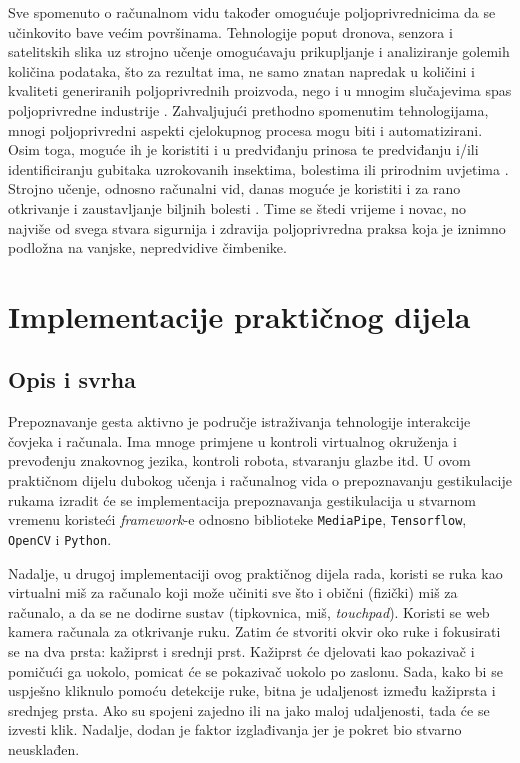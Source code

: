 \documentclass[]{foi} %
\begin{document}
Sve spomenuto o računalnom vidu također omogućuje poljoprivrednicima da se učinkovito bave većim površinama. Tehnologije poput dronova, senzora i satelitskih slika uz strojno učenje omogućavaju prikupljanje i analiziranje golemih količina podataka, što za rezultat ima, ne samo znatan napredak u količini i kvaliteti generiranih poljoprivrednih proizvoda, nego i u mnogim slučajevima spas poljoprivredne industrije \cite{vidhya}. Zahvaljujući prethodno spomenutim tehnologijama, mnogi poljoprivredni aspekti cjelokupnog procesa mogu biti i automatizirani. Osim toga, moguće ih je koristiti i u predviđanju prinosa te predviđanju i/ili identificiranju gubitaka uzrokovanih insektima, bolestima ili prirodnim uvjetima \cite{poljoprivreda}. Strojno učenje, odnosno računalni vid, danas moguće je koristiti i za rano otkrivanje i zaustavljanje biljnih bolesti \cite{vidhya}. Time se štedi vrijeme i novac, no najviše od svega stvara sigurnija i zdravija poljoprivredna praksa koja je iznimno podložna na vanjske, nepredvidive čimbenike.

\chapter{Implementacije praktičnog dijela}
\section{Opis i svrha}

Prepoznavanje gesta aktivno je područje istraživanja tehnologije interakcije čovjeka i računala. Ima mnoge primjene u kontroli virtualnog okruženja i prevođenju znakovnog jezika, kontroli robota, stvaranju glazbe itd. U ovom praktičnom dijelu dubokog učenja i računalnog vida o prepoznavanju gestikulacije rukama izradit će se implementacija prepoznavanja gestikulacija u stvarnom vremenu koristeći \textit{framework}-e odnosno biblioteke \texttt{MediaPipe}, \texttt{Tensorflow}, \texttt{OpenCV} i \texttt{Python}.

Nadalje, u drugoj implementaciji ovog praktičnog dijela rada, koristi se ruka kao virtualni miš za računalo koji može učiniti sve što i obični (fizički) miš za računalo, a da se ne dodirne sustav (tipkovnica, miš, \textit{touchpad}). Koristi se web kamera računala za otkrivanje ruku. Zatim će stvoriti okvir oko ruke i fokusirati se na dva prsta: kažiprst i srednji prst. Kažiprst će djelovati kao pokazivač i pomičući ga uokolo, pomicat će se pokazivač uokolo po zaslonu. Sada, kako bi se uspješno kliknulo pomoću detekcije ruke, bitna je udaljenost između kažiprsta i srednjeg prsta. Ako su spojeni zajedno ili na jako maloj udaljenosti, tada će se izvesti klik. Nadalje, dodan je faktor izglađivanja jer je pokret bio stvarno neusklađen.
\end{document}
